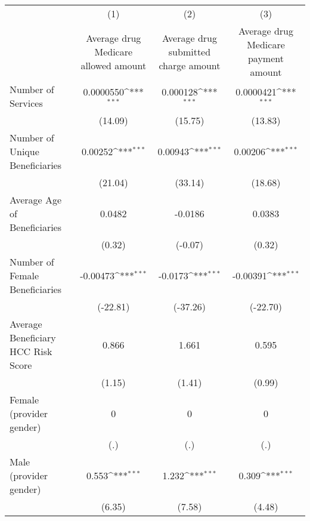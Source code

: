 \def\sym#1{\ifmmode^{#1}\else\(^{#1}\)\fi}
\begin{adjustbox}{max
width={\textwidth},caption={Average Cost per Drug Service over Time, by Provider\label{table:aggregatedrug1}},nofloat=table}
\begin{tabular}{l*{3}{c}}
\toprule
                    &\multicolumn{1}{c}{(1)}&\multicolumn{1}{c}{(2)}&\multicolumn{1}{c}{(3)}\\
                    &\multicolumn{1}{c}{Average drug Medicare allowed amount}&\multicolumn{1}{c}{Average drug submitted charge amount}&\multicolumn{1}{c}{Average drug Medicare payment amount}\\
\midrule
Number of Services  &   0.0000550\sym{***}&    0.000128\sym{***}&   0.0000421\sym{***}\\
                    &     (14.09)         &     (15.75)         &     (13.83)         \\
\addlinespace
Number of Unique Beneficiaries&     0.00252\sym{***}&     0.00943\sym{***}&     0.00206\sym{***}\\
                    &     (21.04)         &     (33.14)         &     (18.68)         \\
\addlinespace
Average Age of Beneficiaries&      0.0482         &     -0.0186         &      0.0383         \\
                    &      (0.32)         &     (-0.07)         &      (0.32)         \\
\addlinespace
Number of Female Beneficiaries&    -0.00473\sym{***}&     -0.0173\sym{***}&    -0.00391\sym{***}\\
                    &    (-22.81)         &    (-37.26)         &    (-22.70)         \\
\addlinespace
Average Beneficiary HCC Risk Score&       0.866         &       1.661         &       0.595         \\
                    &      (1.15)         &      (1.41)         &      (0.99)         \\
\addlinespace
Female (provider gender)&           0         &           0         &           0         \\
                    &         (.)         &         (.)         &         (.)         \\
\addlinespace
Male (provider gender)&       0.553\sym{***}&       1.232\sym{***}&       0.309\sym{***}\\
                    &      (6.35)         &      (7.58)         &      (4.48)         \\

\end{tabular}
\end{adjustbox}
